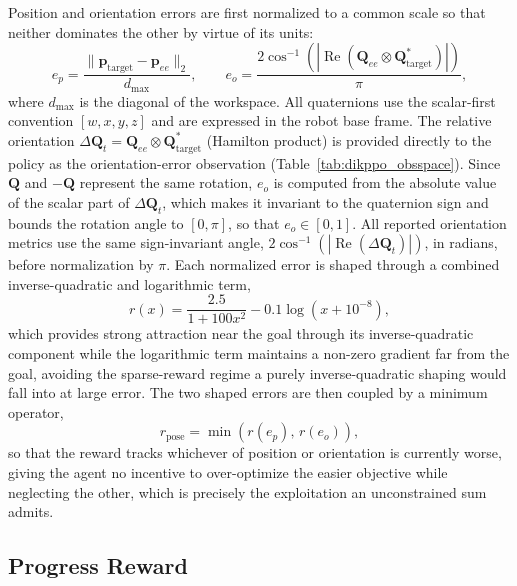 Position and orientation errors are first normalized to a common scale so that neither dominates
the other by virtue of its units:
\begin{equation}
e_p = \frac{\lVert \mathbf{p}_{\text{target}} - \mathbf{p}_{ee} \rVert_2}{d_{\max}}, \qquad
e_o = \frac{2 \cos^{-1}\!\left( \left| \operatorname{Re}(\mathbf{Q}_{ee} \otimes \mathbf{Q}_{\text{target}}^*) \right| \right)}{\pi},
\label{eq:dikppo_normerror}
\end{equation}
where $d_{\max}$ is the diagonal of the workspace. All quaternions use the scalar-first convention
$[w, x, y, z]$ and are expressed in the robot base frame. The relative orientation $\Delta\mathbf{Q}_t
= \mathbf{Q}_{ee} \otimes \mathbf{Q}_{\text{target}}^*$ (Hamilton product) is provided directly to
the policy as the orientation-error observation (Table~\ref{tab:dikppo_obsspace}). Since
$\mathbf{Q}$ and $-\mathbf{Q}$ represent the same rotation, $e_o$ is computed from the absolute
value of the scalar part of $\Delta\mathbf{Q}_t$, which makes it invariant to the quaternion sign and
bounds the rotation angle to $[0, \pi]$, so that $e_o \in [0, 1]$. All reported orientation metrics
use the same sign-invariant angle, $2\cos^{-1}(|\operatorname{Re}(\Delta\mathbf{Q}_t)|)$, in radians,
before normalization by $\pi$. Each normalized error is shaped through a combined inverse-quadratic
and logarithmic term,
\begin{equation}
r(x) = \frac{2.5}{1 + 100 x^2} - 0.1 \log\!\left( x + 10^{-8} \right),
\label{eq:dikppo_shaping}
\end{equation}
which provides strong attraction near the goal through its inverse-quadratic component while the
logarithmic term maintains a non-zero gradient far from the goal, avoiding the sparse-reward regime
a purely inverse-quadratic shaping would fall into at large error. The two shaped errors are then
coupled by a minimum operator,
\begin{equation}
r_{\text{pose}} = \min\!\left( r(e_p),\, r(e_o) \right),
\label{eq:dikppo_minop}
\end{equation}
so that the reward tracks whichever of position or orientation is currently worse, giving the agent
no incentive to over-optimize the easier objective while neglecting the other, which is precisely
the exploitation an unconstrained sum admits.

\subsection{Progress Reward}\label{subsec:dikppo_progress}

